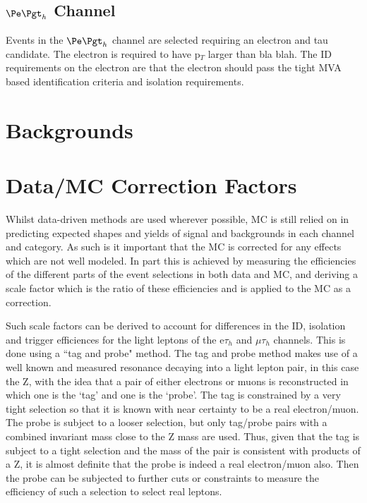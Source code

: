 \subsection{$\etau$ Channel}

Events in the $\etau$ channel are selected requiring an electron and tau
candidate. The electron is required to have p$_{T}$ larger than bla blah. The ID
requirements on the electron are that the electron should pass the tight MVA
based identification criteria and isolation requirements.  


\section{Backgrounds}
\label{sec:backgrounds}


\section{Data/MC Correction Factors}
\label{sec:datamcfactors}

Whilst data-driven methods are used wherever possible, MC is still
relied on in predicting expected shapes and yields of signal and backgrounds in
each channel and category. As such is it important that the MC is corrected for
any effects which are not well modeled. In part this is achieved by measuring
the efficiencies of the different parts of the event selections in both data and
MC, and deriving a scale factor which is the ratio of these efficiencies and is
applied to the MC as a correction.

Such scale factors can be derived to account for differences in the ID, isolation and trigger
efficiences for the light leptons of the e$\tau_{h}$ and $\mu\tau_{h}$ channels.
This is done using a ``tag and probe" method.
The tag and probe method makes use of a well known and measured resonance decaying
into a light lepton pair, in this case
the Z, with the idea that a pair of either electrons or muons is
reconstructed in which one
is the `tag' and one is the `probe'. The tag is constrained by a very tight
selection so that it is known with near certainty to be a real electron/muon.
The probe is subject to a looser selection, but only tag/probe pairs with a
combined invariant mass close to the Z mass are used. Thus, given that the tag
is subject to a tight selection and the mass of the pair is consistent with
products of a Z, it is almost definite that the probe is indeed a real
electron/muon also. Then the probe can be subjected to further cuts or
constraints to measure the efficiency of such a selection to select real
leptons.

